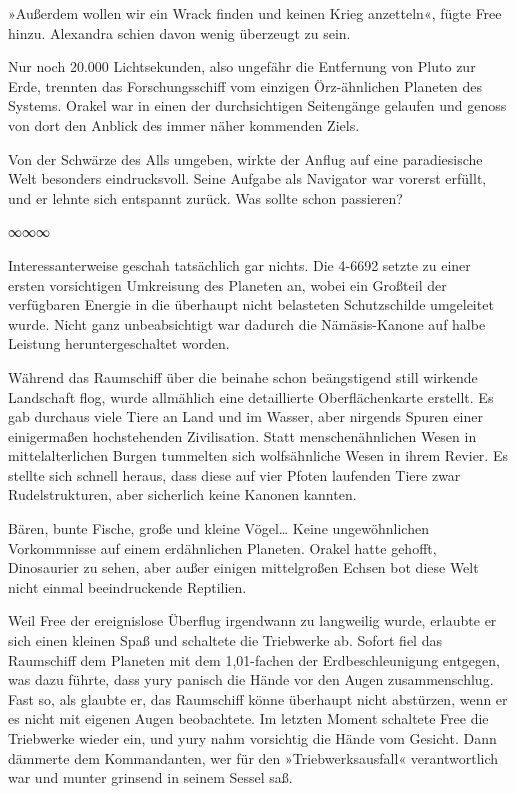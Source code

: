 »Außerdem wollen wir ein Wrack finden und keinen Krieg anzetteln«, fügte Free hinzu. Alexandra schien davon wenig überzeugt zu sein.

Nur noch 20.000 Lichtsekunden, also ungefähr die Entfernung von Pluto zur Erde, trennten das Forschungsschiff vom einzigen Örz-ähnlichen Planeten des Systems. Orakel war in einen der durchsichtigen Seitengänge gelaufen und genoss von dort den Anblick des immer näher kommenden Ziels.

Von der Schwärze des Alls umgeben, wirkte der Anflug auf eine paradiesische Welt besonders eindrucksvoll. Seine Aufgabe als Navigator war vorerst erfüllt, und er lehnte sich entspannt zurück. Was sollte schon passieren?

\begin{center}
    ∞∞∞
\end{center}

Interessanterweise geschah tatsächlich gar nichts. Die 4-6692 setzte zu einer ersten vorsichtigen Umkreisung des Planeten an, wobei ein Großteil der verfügbaren Energie in die überhaupt nicht belasteten Schutzschilde umgeleitet wurde. Nicht ganz unbeabsichtigt war dadurch die Nämäsis-Kanone auf halbe Leistung heruntergeschaltet worden.

Während das Raumschiff über die beinahe schon beängstigend still wirkende Landschaft flog, wurde allmählich eine detaillierte Oberflächenkarte erstellt. Es gab durchaus viele Tiere an Land und im Wasser, aber nirgends Spuren einer einigermaßen hochstehenden Zivilisation. Statt menschenähnlichen Wesen in mittelalterlichen Burgen tummelten sich wolfsähnliche Wesen in ihrem Revier. Es stellte sich schnell heraus, dass diese auf vier Pfoten laufenden Tiere zwar Rudelstrukturen, aber sicherlich keine Kanonen kannten.

Bären, bunte Fische, große und kleine Vögel… Keine ungewöhnlichen Vorkommnisse auf einem erdähnlichen Planeten. Orakel hatte gehofft, Dinosaurier zu sehen, aber außer einigen mittelgroßen Echsen bot diese Welt nicht einmal beeindruckende Reptilien.

Weil Free der ereignislose Überflug irgendwann zu langweilig wurde, erlaubte er sich einen kleinen Spaß und schaltete die Triebwerke ab. Sofort fiel das Raumschiff dem Planeten mit dem 1,01-fachen der Erdbeschleunigung entgegen, was dazu führte, dass yury panisch die Hände vor den Augen zusammenschlug. Fast so, als glaubte er, das Raumschiff könne überhaupt nicht abstürzen, wenn er es nicht mit eigenen Augen beobachtete. Im letzten Moment schaltete Free die Triebwerke wieder ein, und yury nahm vorsichtig die Hände vom Gesicht. Dann dämmerte dem Kommandanten, wer für den »Triebwerksausfall« verantwortlich war und munter grinsend in seinem Sessel saß.

